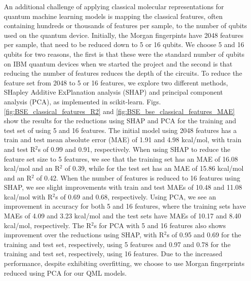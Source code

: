 \documentclass[journal=jacsat,manuscript=article]{achemso}
\begin{document}
An additional challenge of applying classical molecular representations for quantum machine learning models is mapping the classical features, often containing hundreds or thousands of features per sample, to the number of qubits used on the quantum device.
Initially, the Morgan fingerpints have 2048 features per sample, that need to be reduced down to 5 or 16 qubits.
We choose 5 and 16 qubits for two reasons, the first is that these were the standard number of qubits on IBM quantum devices when we started the project and the second is that reducing the number of features reduces the depth of the circuits.
To reduce the feature set from 2048 to 5 or 16 features, we explore two different methods, SHapley Additive ExPlanation analysis (SHAP)\cite{lundberg_unified_2017} and principal component analysis (PCA), as implemented in scikit-learn.\cite{pedregosa_scikit-learn_2011}
Figs. \ref{fig:BSE_classical_features_R2} and \ref{fig:BSE_bse_classical_features_MAE} show the results for the reductions using SHAP and PCA for the training and test set of using 5 and 16 features.
The initial model using 2048 features has a train and test mean absolute error (MAE) of 1.91 and 4.98 kcal/mol, with train and test R$^{2}$s of 0.99 and 0.91, respectively.
When using SHAP to reduce the feature set size to 5 features, we see that the training set has an MAE of 16.08 kcal/mol and an R$^{2}$ of 0.39, while for the test set has an MAE of 15.86 kcal/mol and an R$^{2}$ of 0.42.
When the number of features is reduced to 16 features using SHAP, we see slight improvements with train and test MAEs of 10.48 and 11.08 kcal/mol with R$^{2}$s of 0.69 and 0.68, respectively.
Using PCA, we see an improvement in accuracy for both 5 and 16 features, where the training sets have MAEs of 4.09 and 3.23 kcal/mol and the test sets have MAEs of 10.17 and 8.40 kcal/mol, respectively.
The R$^{2}$s for PCA with 5 and 16 features also shows improvement over the reductions using SHAP, with R$^{2}$s of 0.95 and 0.69 for the training and test set, respectively, using 5 features and 0.97 and 0.78 for the training and test set, respectively, using 16 features.
Due to the increased performance, despite exhibiting overfitting, we choose to use Morgan fingerprints reduced using PCA for our QML models.
\end{document}
